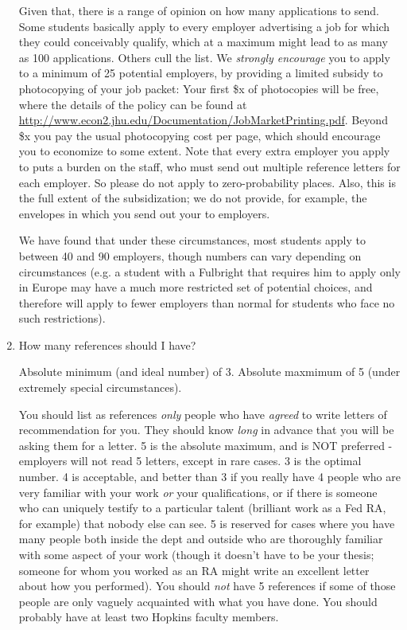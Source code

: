 \documentclass{econtex}
\begin{document}
\begin{enumerate}
Given that, there is a range of opinion on how many applications to
send.  Some students basically apply to every employer advertising a
job for which they could conceivably qualify, which at a maximum might 
lead to as many as 100 applications.  Others cull the list.  We {\it strongly
  encourage} you to apply to a minimum of 25 potential employers, by
providing a limited subsidy to photocopying of your job packet: Your
first \$x of photocopies will be free, where the details of the policy
can be found at
\url{http://www.econ2.jhu.edu/Documentation/JobMarketPrinting.pdf}.
Beyond \$x you pay the usual photocopying cost per page, which should
encourage you to economize to some extent.  Note that every extra
employer you apply to puts a burden on the staff, who must send out
multiple reference letters for each employer.  So please do not apply
to zero-probability places.  Also, this is the full extent of the
subsidization; we do not provide, for example, the envelopes in which
you send out your \Acorn to employers.

We have found that under these circumstances, most students apply to between 
40 and 90 employers, though numbers can vary depending on circumstances 
(e.g. a student with a Fulbright that requires him to apply only in 
Europe may have a much more restricted set of potential choices,
and therefore will apply to fewer employers than normal for students who face
no such restrictions).

\item How many references should I have?

Absolute minimum (and ideal number) of 3.  Absolute maxmimum of 5 (under
extremely special circumstances).  

You should list as references {\it only} people who have {\it agreed}
to write letters of recommendation for you.  They should know {\it long} in advance that you will be asking them for a letter.  5 is the absolute
maximum, and is NOT preferred - employers will not read 5 letters,
except in rare cases.  3 is the optimal number.  4 is acceptable, and
better than 3 if you really have 4 people who are very familiar with
your work {\it or} your qualifications, or if there is someone who can
uniquely testify to a particular talent (brilliant work as a Fed RA,
for example) that nobody else can see.  5 is reserved for cases where
you have many people both inside the dept and outside who are
thoroughly familiar with some aspect of your work (though it doesn't
have to be your thesis; someone for whom you worked as an RA might
write an excellent letter about how you performed).  You should {\it
  not} have 5 references if some of those people are only vaguely
acquainted with what you have done.  You should probably have at least
two Hopkins faculty members.


\end{enumerate}
\end{document}
